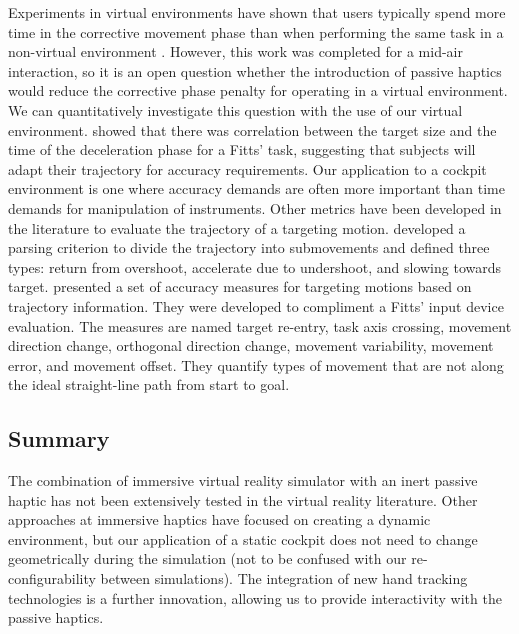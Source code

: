 Experiments in virtual environments have shown that users typically spend more time in the corrective movement phase than when performing the same task in a non-virtual environment \citep{liu_comparing_2009}.
However, this work was completed for a mid-air interaction, so it is an open question whether the introduction of passive haptics would reduce the corrective phase penalty for operating in a virtual environment.
We can quantitatively investigate this question with the use of our virtual environment.
\citet{mackenzie_three-dimensional_1987} showed that there was correlation between the target size and the time of the deceleration phase for a Fitts' task, suggesting that subjects will adapt their trajectory for accuracy requirements.
Our application to a cockpit environment is one where accuracy demands are often more important than time demands for manipulation of instruments.
%
%
Other metrics have been developed in the literature to evaluate the trajectory of a targeting motion.
\citet{meyer_optimality_1988} developed a parsing criterion to divide the trajectory into submovements and defined three types: return from overshoot, accelerate due to undershoot, and slowing towards target.
\citet{mackenzie_accuracy_2001} presented a set of accuracy measures for targeting motions based on trajectory information.
They were developed to compliment a Fitts' input device evaluation.
The measures are named target re-entry, task axis crossing, movement direction change, orthogonal direction change, movement variability, movement error, and movement offset.
They quantify types of movement that are not along the ideal straight-line path from start to goal.


\subsection{Summary}
\label{summary}

The combination of immersive virtual reality simulator with an inert passive haptic has not been extensively tested in the virtual reality literature.
Other approaches at immersive haptics have focused on creating a dynamic environment, but our application of a static cockpit does not need to change geometrically during the simulation (not to be confused with our re-configurability between simulations).
The integration of new hand tracking technologies is a further innovation, allowing us to provide interactivity with the passive haptics.

